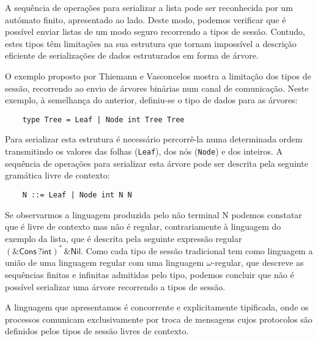 
 
A sequência de operações para serializar a lista pode ser reconhecida
por um autómato finito, apresentado ao lado.  Deste modo, podemos
verificar que é possível enviar listas de um modo seguro recorrendo a
tipos de sessão. Contudo, estes tipos têm limitações na sua estrutura
que tornam impossível a descrição eficiente de serializações de dados
estruturados em forma de árvore.

O exemplo proposto por Thiemann e Vasconcelos \cite{ref-cfst}
mostra a limitação dos tipos de sessão, recorrendo ao envio de árvores binárias num canal de comunicação. Neste exemplo, à semelhança do anterior, definiu-se o tipo de dados para as árvores:
\begin{lstlisting}
	type Tree = Leaf | Node int Tree Tree
\end{lstlisting}
Para serializar esta estrutura é necessário percorrê-la numa determinada ordem transmitindo os valores das folhas (\lstinline"Leaf"), dos nós (\lstinline"Node") e dos inteiros. A sequência de operações para serializar esta árvore pode ser descrita pela seguinte gramática livre de contexto:
\begin{lstlisting}
	N ::= Leaf | Node int N N
\end{lstlisting}
Se observarmos a linguagem produzida pelo não terminal N podemos constatar que é livre de contexto mas não é regular, contrariamente à linguagem do exemplo da lista, que é descrita pela seguinte expressão regular $(\&\textsf{Cons}\,?\textsf{int})^{*}\,\&\textsf{Nil}$. Como cada tipo de sessão tradicional tem como linguagem a união de uma linguagem regular com uma linguagem $\omega$-regular, que descreve as sequências finitas e infinitas admitidas pelo tipo, podemos concluir que não é possível serializar uma árvore recorrendo a tipos de sessão.

A linguagem que apresentamos é concorrente e explicitamente tipificada, onde os processos comunicam exclusivamente por troca de mensagens cujos protocolos são definidos pelos tipos de sessão livres de contexto.



